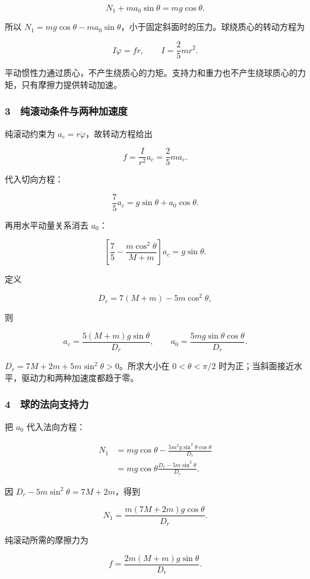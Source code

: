 \documentclass[12pt,a4paper,fontset=fandol]{ctexart}
\begin{document}
\[\boxed{N_1+ma_0\sin\theta=mg\cos\theta.}\]

所以
\(N_1=mg\cos\theta-ma_0\sin\theta\)，小于固定斜面时的压力。球绕质心的转动方程为

\[I\ddot\varphi=fr,\qquad I=\frac25mr^2.\]

平动惯性力通过质心，不产生绕质心的力矩。支持力和重力也不产生绕球质心的力矩，只有摩擦力提供转动加速。

\subsubsection{3　纯滚动条件与两种加速度}\label{ux7eafux6edaux52a8ux6761ux4ef6ux4e0eux4e24ux79cdux52a0ux901fux5ea6}

纯滚动约束为 \(a_c=r\ddot\varphi\)，故转动方程给出

\[f=\frac I{r^2}a_c=\frac25ma_c.\]

代入切向方程：

\[\frac75a_c=g\sin\theta+a_0\cos\theta.\]

再用水平动量关系消去 \(a_0\)：

\[\left[\frac75-\frac{m\cos^2\theta}{M+m}\right]a_c=g\sin\theta.\]

定义

\[D_r=7(M+m)-5m\cos^2\theta,\]

则

\[\boxed{a_c=\frac{5(M+m)g\sin\theta}{D_r},\qquad
a_0=\frac{5mg\sin\theta\cos\theta}{D_r}.}\]

\(D_r=7M+2m+5m\sin^2\theta>0\)。所求大小在 \(0<\theta<\pi/2\)
时为正；当斜面接近水平，驱动力和两种加速度都趋于零。

\subsubsection{4　球的法向支持力}\label{ux7403ux7684ux6cd5ux5411ux652fux6301ux529b}

把 \(a_0\) 代入法向方程：

\[\begin{aligned}
N_1&=mg\cos\theta-
\frac{5m^2g\sin^2\theta\cos\theta}{D_r}\\
&=mg\cos\theta\frac{D_r-5m\sin^2\theta}{D_r}.
\end{aligned}\]

因 \(D_r-5m\sin^2\theta=7M+2m\)，得到

\[\boxed{N_1=\frac{m(7M+2m)g\cos\theta}{D_r}.}\]

纯滚动所需的摩擦力为

\[\boxed{f=\frac{2m(M+m)g\sin\theta}{D_r}.}\]
\end{document}
